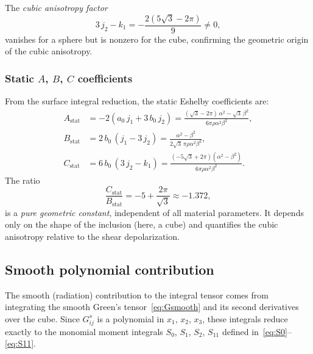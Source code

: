 \documentclass[11pt,a4paper]{article}
\begin{document}
The \emph{cubic anisotropy factor}
\begin{equation}
  3\,j_2 - k_1 = -\frac{2(5\sqrt{3} - 2\pi)}{9}
  \neq 0,
  \label{eq:aniso_factor}
\end{equation}
vanishes for a sphere but is nonzero for the cube, confirming the
geometric origin of the cubic anisotropy.

\subsubsection{Static \texorpdfstring{$A$, $B$, $C$}{A, B, C}
  coefficients}

From the surface integral reduction, the static Eshelby
coefficients are:
\begin{align}
  A_\text{stat} &= -2(a_0\,j_1 + 3\,b_0\,j_2)
  = \frac{(\sqrt{3} - 2\pi)\,\alpha^2 - \sqrt{3}\,\beta^2}
         {6\pi\rho\alpha^2\beta^2},
  \label{eq:Astat} \\[6pt]
  B_\text{stat} &= 2\,b_0\,(j_1 - 3\,j_2)
  = \frac{\alpha^2 - \beta^2}
         {2\sqrt{3}\,\pi\rho\alpha^2\beta^2},
  \label{eq:Bstat} \\[6pt]
  C_\text{stat} &= 6\,b_0\,(3\,j_2 - k_1)
  = \frac{(-5\sqrt{3} + 2\pi)(\alpha^2 - \beta^2)}
         {6\pi\rho\alpha^2\beta^2}.
  \label{eq:Cstat}
\end{align}
The ratio
\begin{equation}
  \boxed{
  \frac{C_\text{stat}}{B_\text{stat}}
  = -5 + \frac{2\pi}{\sqrt{3}}
  \approx -1.372,
  }
  \label{eq:CoverB}
\end{equation}
is a \emph{pure geometric constant}, independent of all material
parameters. It depends only on the shape of the inclusion
(here, a cube) and quantifies the cubic anisotropy relative to the
shear depolarization.

\subsection{Smooth polynomial contribution}
\label{sec:smooth_contrib}

The smooth (radiation) contribution to the integral tensor comes
from integrating the smooth Green's tensor~\eqref{eq:Gsmooth} and
its second derivatives over the cube. Since $G^s_{ij}$ is a
polynomial in $x_1$, $x_2$, $x_3$, these integrals reduce
exactly to the monomial moment integrals
$S_0$, $S_1$, $S_2$, $S_{11}$ defined
in~\eqref{eq:S0}--\eqref{eq:S11}.
\end{document}
